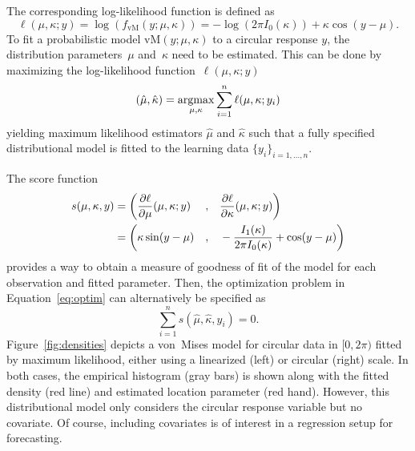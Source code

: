 \documentclass[nojss,shortnames]{jss}
\newcommand{\argmax}{\operatorname{argmax}\displaylimits}
\numberwithin{equation}{section}
\begin{document}
The corresponding log-likelihood function is defined as
\begin{equation}
    \ell(\mu, \kappa; y) = \log(f_\mathrm{vM}(y;\mu, \kappa))
    = -\log(2 \pi I_0(\kappa)) + \kappa \cos(y - \mu).\label{equ:vM:loglik}
\end{equation}
To fit a probabilistic model $\text{vM}(y; \mu, \kappa)$ to a circular response
$y$, the distribution parameters~$\mu$ and~$\kappa$ need to be estimated. This
can be done by maximizing the log-likelihood function~$\ell(\mu, \kappa; y)$
\begin{equation}\label{eq:optim}
  (\hat{\mu},\hat{\kappa}) = \argmax_{\mu,\kappa} \sum_{i=1}^n \ell(\mu, \kappa; y_i) 
\end{equation}
yielding maximum likelihood estimators $\hat{\mu}$ and $\hat{\kappa}$ such that
a fully specified distributional model is fitted to the learning data
$\{y_i\}_{i=1,\ldots,n}$.

The score function
\begin{equation}
  \label{eq:scores}
  \begin{aligned}
    s(\mu, \kappa, y) &= \bigg(\frac{\partial \ell}{\partial \mu}(\mu,\kappa; y)
    \smallskip &,
    \quad & \frac{\partial \ell}{\partial \kappa}(\mu,\kappa; y) \bigg) 
    \\
    &= \bigg(\kappa \sin(y-\mu)
    \smallskip &,
    \quad &-\frac{I_1(\kappa)}{2\pi I_0(\kappa)}+\cos(y-\mu) \bigg)
  \end{aligned}
\end{equation}
provides a way to obtain a measure of goodness of fit of the model for each
observation and fitted parameter. Then, the optimization problem in
Equation~\ref{eq:optim} can alternatively be specified as 
\begin{equation}
  \sum_{i = 1}^n s(\hat{\mu}, \hat{\kappa}, y_i) = 0.
\end{equation}
Figure~\ref{fig:densities} depicts a von~Mises model for circular data in $[0, 2
\pi)$ fitted by maximum likelihood, either using a linearized (left) or
circular (right) scale. In both cases, the empirical histogram (gray bars) is
shown along with the fitted density (red line) and estimated location parameter
(red hand). However, this distributional model only considers the circular
response variable but no covariate. Of course, including covariates is of
interest in a regression setup for forecasting.
\end{document}
